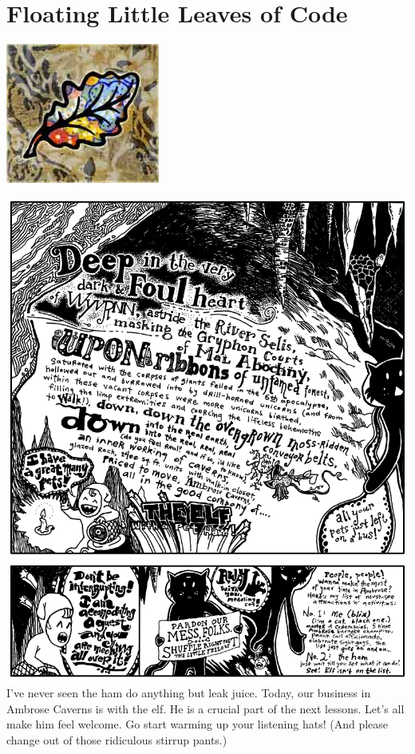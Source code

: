 \documentclass[10pt,twoside]{report}
\begin{document}
\chapter{Floating Little Leaves of Code}
\vfill
\begin{center}
  \includegraphics{cache/chapterpoignantguide4.png}
\end{center}
\vspace{2cm}
\newpage
\thispagestyle{empty}
\mbox{}
\clearpage
	\includegraphics[width=1.0\textwidth]{cache/20.png}
        \includegraphics[width=1.0\textwidth]{cache/21.png}
\clearpage
I've never seen the ham do anything but leak juice.  Today, our
business in Ambrose Caverns is with the elf.  He is a crucial part of
the next lessons. Let's all make him feel welcome. Go start warming up
your listening hats!  (And please change out of those ridiculous
stirrup pants.)
\end{document}

